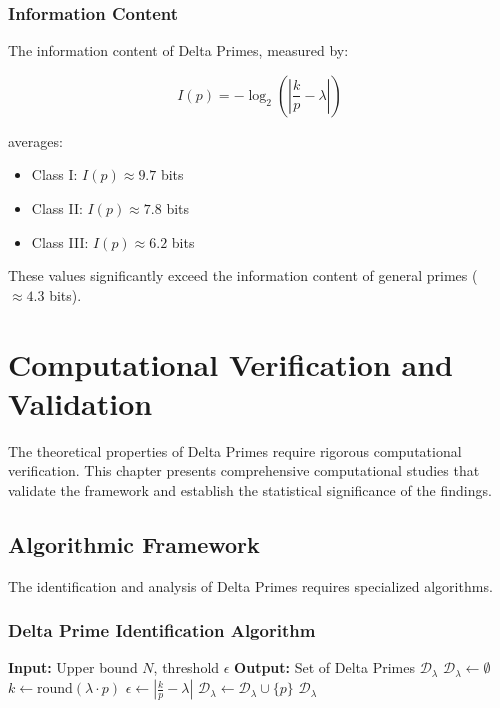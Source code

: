 \documentclass[12pt,a4paper]{report}
\newcommand{\lambdaval}{\lambda}
\begin{document}
\begin{itemize}
\subsection{Information Content}

The information content of Delta Primes, measured by:

\[
I(p) = -\log_2\left(\left| \frac{k}{p} - \lambdaval \right|\right)
\]

averages:
\begin{itemize}
\item Class I: $I(p) \approx 9.7$ bits
\item Class II: $I(p) \approx 7.8$ bits
\item Class III: $I(p) \approx 6.2$ bits
\end{itemize}

These values significantly exceed the information content of general primes ($\approx 4.3$ bits).

\chapter{Computational Verification and Validation}

The theoretical properties of Delta Primes require rigorous computational verification. This chapter presents comprehensive computational studies that validate the framework and establish the statistical significance of the findings.

\section{Algorithmic Framework}

The identification and analysis of Delta Primes requires specialized algorithms.

\subsection{Delta Prime Identification Algorithm}

\begin{algorithm}[H]
\caption{Delta Prime Identification}
\begin{algorithmic}[1]
\STATE \textbf{Input:} Upper bound $N$, threshold $\epsilon$
\STATE \textbf{Output:} Set of Delta Primes $\mathcal{D}_{\lambdaval}$
\STATE $\mathcal{D}_{\lambdaval} \leftarrow \emptyset$
        \STATE $k \leftarrow \text{round}(\lambdaval \cdot p)$
        \STATE $\epsilon \leftarrow \left| \frac{k}{p} - \lambdaval \right|$
            \STATE $\mathcal{D}_{\lambdaval} \leftarrow \mathcal{D}_{\lambdaval} \cup \{p\}$
        \ENDIF
    \ENDIF
\ENDFOR
\RETURN $\mathcal{D}_{\lambdaval}$
\end{algorithmic}
\end{algorithm}


\end{itemize}
\end{document}
